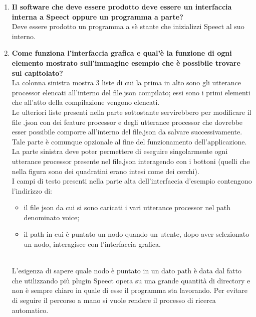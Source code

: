 \documentclass[openany,12pt,a4paper]{article}
\begin{document}
\begin{enumerate}
	\item \textbf{ Il software che deve essere prodotto deve essere un interfaccia interna a Speect oppure un programma a parte?}\\
	Deve essere prodotto un programma a sè stante che inizializzi Speect al suo interno.

	\item \textbf{Come funziona l'interfaccia grafica e qual'è la funzione di ogni elemento mostrato sull'immagine esempio che è possibile trovare sul capitolato?}\\
	La colonna sinistra mostra 3 liste di cui la prima in alto sono gli utterance processor elencati all'interno del file.json compilato; essi sono i primi elementi che all'atto della compilazione vengono elencati.
    \\ Le ulteriori liste presenti nella parte sottostante servirebbero per modificare il file .json con dei feature processor e degli utterance processor che dovrebbe esser possibile comporre all'interno del file.json da salvare successivamente.
    \\ Tale parte è comunque opzionale al fine del funzionamento dell'applicazione.
    \\ La parte sinistra deve poter permettere di eseguire singolarmente ogni utterance processor presente nel file.json interagendo con i bottoni (quelli che nella figura sono dei quadratini erano intesi come dei cerchi).
    \\I campi di testo presenti nella parte alta dell'interfaccia d'esempio contengono l'indirizzo di:
    \begin{itemize}
    \item il file json da cui si sono caricati i vari utterance processor nel path denominato voice;
    \item il path in cui è puntato un nodo quando un utente, dopo aver selezionato un nodo, interagisce con l'interfaccia grafica.
    \end{itemize}
    \\ L'esigenza di sapere quale nodo è puntato in un dato path è data dal fatto che utilizzando più plugin Speect opera su una grande quantità di directory e non è sempre chiaro in quale di esse il programma sta lavorando. Per evitare di seguire il percorso a mano si vuole rendere il processo di ricerca automatico.


\end{enumerate}
\end{document}
